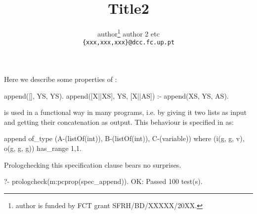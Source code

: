 \documentclass[11pt,twoside]{article}
\makeatletter
\def\cleardoublepage{\clearpage\if@twoside \ifodd\c@page\else%
\hbox{}%
\thispagestyle{empty}
\newpage%
\if@twocolumn\hbox{}\newpage\fi\fi\fi}
\makeatother
\begin{document}


\mkcoverpage

\title{Title2}
\author{author\thanks{author is funded by FCT grant
SFRH/BD/XXXXX/20XX.}\hspace{0.5cm} author 2 \hspace{0.5cm}
etc\\ {\tt \{xxx,xxx,xxx\}@dcc.fc.up.pt}}

\date{}
\cleardoublepage

\maketitle


Here we describe some properties of  :
%
\begin{yapcode}
 append([], YS, YS).
 append([X||XS], YS, [X||AS]) :- append(XS, YS, AS).
\end{yapcode}


 is used in a functional way in many programs,
i.e. by giving it two lists as input and getting their concatenation as
output.
%
This behaviour is specified in \plqc{} as:
\begin{yapcode}
 append of_type (A-(listOf(int)), B-(listOf(int)), C-(variable))
   where (i(g, g, v), o(g, g, g))  has_range {1,1}.
\end{yapcode}
%
Prologchecking this specification clause bears no surprises.
%
\begin{yapcode}
   ?- prologcheck(m:pcprop(spec_append)).
 OK: Passed 100 test(s).
\end{yapcode}
\end{document}
